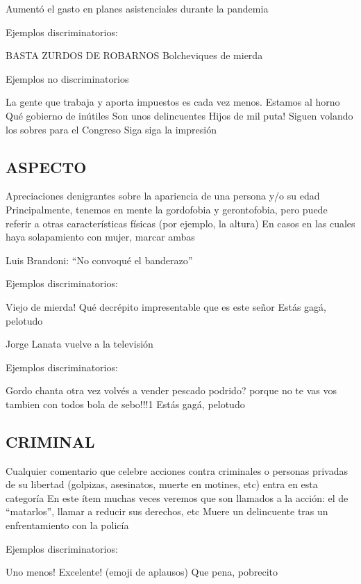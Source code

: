 Aumentó el gasto en planes asistenciales durante la pandemia

Ejemplos discriminatorios:

BASTA ZURDOS DE ROBARNOS
Bolcheviques de mierda

Ejemplos no discriminatorios

La gente que trabaja y aporta impuestos es cada vez menos. Estamos al horno
Qué gobierno de inútiles
Son unos delincuentes
Hijos de mil puta!
Siguen volando los sobres para el Congreso
Siga siga la impresión




\subsection{ASPECTO}

Apreciaciones denigrantes sobre la apariencia de una persona y/o su edad
Principalmente, tenemos en mente la gordofobia y gerontofobia, pero puede referir a otras características físicas (por ejemplo, la altura)
En casos en las cuales haya solapamiento con mujer, marcar ambas


Luis Brandoni: “No convoqué el banderazo”

Ejemplos discriminatorios:

Viejo de mierda!
Qué decrépito impresentable que es este señor
Estás gagá, pelotudo

Jorge Lanata vuelve a la televisión

Ejemplos discriminatorios:

Gordo chanta otra vez volvés a vender pescado podrido?
porque no te vas vos tambien con todos bola de sebo!!!1
Estás gagá, pelotudo









\subsection{CRIMINAL}

Cualquier comentario que celebre acciones contra criminales o personas privadas de su libertad (golpizas, asesinatos, muerte en motines, etc) entra en esta categoría
En este ítem muchas veces veremos que son llamados a la acción: el de “matarlos”, llamar a reducir sus derechos, etc
Muere un delincuente tras un enfrentamiento con la policía

Ejemplos discriminatorios:

Uno menos!
Excelente!
(emoji de aplausos)
Que pena, pobrecito

